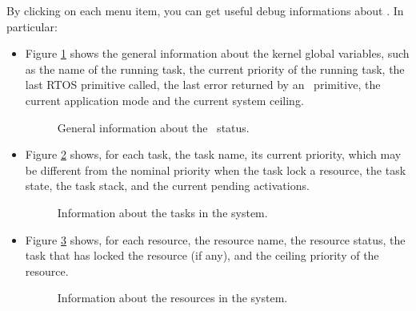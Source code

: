 By clicking on each menu item, you can get useful debug informations
about \ee. In particular:
\begin{itemize}
\item Figure \ref{fig:trace32_os} shows the general information about
  the kernel global variables, such as the name of the running task,
  the current priority of the running task, the last RTOS primitive
  called, the last error returned by an \ee\ primitive, the current
  application mode and the current system ceiling.
%
\begin{figure}
\caption{\label{fig:trace32_os} General information about the \ee\ status.}
\end{figure}
%

\item Figure \ref{fig:trace32_task} shows, for each task, the task
  name, its current priority, which may be different from the nominal
  priority when the task lock a resource, the task state, the task
  stack, and the current pending activations.
%
\begin{figure}
\caption{\label{fig:trace32_task} Information about the tasks in the
system.}
\end{figure}
%

\item Figure \ref{fig:trace32_resource} shows, for each resource, the
  resource name, the resource status, the task that has locked the
  resource (if any), and the ceiling priority of the resource.
%
\begin{figure}
\caption{\label{fig:trace32_resource} Information about the resources
in the system.}
\end{figure}
%


\end{itemize}
